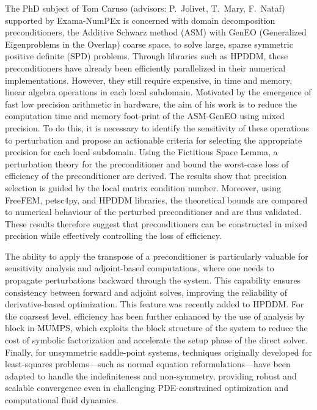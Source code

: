 {\color{blue} The PhD subject of Tom Caruso (advisors: P.~Jolivet, T.~Mary, F.~Nataf) supported by Exama-NumPEx is concerned with domain decomposition preconditioners, the Additive Schwarz method (ASM) with GenEO (Generalized Eigenproblems in the Overlap) coarse space, to solve large, sparse symmetric positive definite (SPD) problems. 
Through libraries such as HPDDM, these preconditioners have already been efficiently parallelized in their numerical implementations. 
However, they still require expensive, in time and memory, linear algebra operations in each local subdomain. 
Motivated by the emergence of fast low precision arithmetic in hardware, the aim of his work is to reduce the computation time and memory foot-print of the ASM-GenEO using mixed precision. 
To do this, it is necessary to identify the sensitivity of these operations to perturbation and propose an actionable criteria for selecting the appropriate precision for each local subdomain.
Using the Fictitious Space Lemma, a perturbation theory for the preconditioner and bound the worst-case loss of efficiency of the preconditioner are derived. The results show that  precision selection is guided by the local matrix condition number. 
Moreover, using FreeFEM, petsc4py, and HPDDM libraries, the theoretical bounds are compared to numerical behaviour of the perturbed preconditioner and are thus validated. 
These results therefore suggest that preconditioners can be constructed in mixed precision while effectively controlling the loss of efficiency.}


 
The ability to apply the transpose of a preconditioner is particularly valuable for sensitivity analysis and adjoint-based computations, where one needs to propagate perturbations backward through the system. This capability ensures consistency between forward and adjoint solves, improving the reliability of derivative-based optimization. This feature was recently added to HPDDM. For the coarsest level, efficiency has been further enhanced by the use of analysis by block in MUMPS, which exploits the block structure of the system to reduce the cost of symbolic factorization and accelerate the setup phase of the direct solver. Finally, for unsymmetric saddle-point systems, techniques originally developed for least-squares problems—such as normal equation reformulations—have been adapted to handle the indefiniteness and non-symmetry, providing robust and scalable convergence even in challenging PDE-constrained optimization and computational fluid dynamics. 
 
